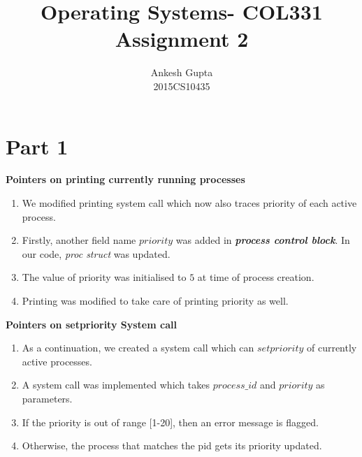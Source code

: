 \documentclass{article}
\newcommand{\bld}[1]{\textbf{#1}}
\newcommand{\ital}[1]{\textit{#1}}
\newcommand{\italb}[1]{\textbf{\textit{#1}}}
\begin{document}
\title{Operating Systems- COL331 \\Assignment 2}
\author{Ankesh Gupta\\2015CS10435}

\date{}
\maketitle

\section*{Part 1}
\bld{Pointers on printing currently running processes}
\begin{enumerate}
	\item We modified printing system call which now also traces priority of each active process. 
	\item Firstly, another field name $priority$ was added in \italb{process control block}. In our code, \ital{proc struct} was updated.
	\item The value of priority was initialised to $5$ at time of process creation.
	\item Printing was modified to take care of printing priority as well.
\end{enumerate}
\bld{Pointers on setpriority System call}
\begin{enumerate}
	\item As a continuation, we created a system call which can $setpriority$ of currently active processes.
	\item A system call was implemented which takes $process\_id$ and $priority$ as parameters.
	\item If the priority is out of range [1-20], then an error message is flagged.
	\item Otherwise, the process that matches the pid gets its priority updated.
\end{enumerate}
\end{document}
